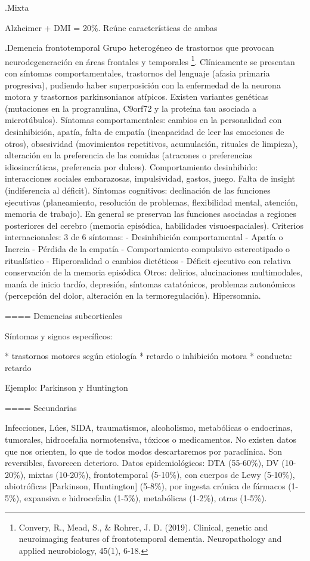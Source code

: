 .Mixta

Alzheimer + DMI = 20\%. Reúne características de ambas

.Demencia frontotemporal
Grupo heterogéneo de trastornos que provocan neurodegeneración en áreas frontales y temporales \footnote{Convery, R., Mead, S., \& Rohrer, J. D. (2019). Clinical, genetic and neuroimaging features of frontotemporal dementia. Neuropathology and applied neurobiology, 45(1), 6-18.}. Clínicamente se presentan con síntomas comportamentales, trastornos del lenguaje (afasia primaria progresiva), pudiendo haber superposición con la enfermedad de la neurona motora y trastornos parkinsonianos atípicos. Existen variantes genéticas (mutaciones en la progranulina, C9orf72 y la proteína tau asociada a microtúbulos).
Síntomas comportamentales: cambios en la personalidad con desinhibición, apatía, falta de empatía (incapacidad de leer las emociones de otros), obsesividad (movimientos repetitivos, acumulación, rituales de limpieza), alteración en la preferencia de las comidas (atracones o preferencias idiosincráticas, preferencia por dulces). Comportamiento desinhibido: interacciones sociales embarazosas, impulsividad, gastos, juego. Falta de insight (indiferencia al déficit).
Síntomas cognitivos: declinación de las funciones ejecutivas (planeamiento, resolución de problemas, flexibilidad mental, atención, memoria de trabajo). En general se preservan las funciones asociadas a regiones posteriores del cerebro (memoria episódica, habilidades visuoespaciales).
Criterios internacionales: 3 de 6 síntomas:
- Desinhibición comportamental
- Apatía o Inercia
- Pérdida de la empatía
- Comportamiento compulsivo estereotipado o ritualístico
- Hiperoralidad o cambios dietéticos
- Déficit ejecutivo con relativa conservación de la memoria episódica
Otros: delirios, alucinaciones multimodales, manía de inicio tardío, depresión, síntomas catatónicos, problemas autonómicos (percepción del dolor, alteración en la termoregulación). Hipersomnia.

==== Demencias subcorticales

Síntomas y signos específicos:

* trastornos motores según etiología
* retardo o inhibición motora
* conducta: retardo

Ejemplo: Parkinson y Huntington

==== Secundarias

Infecciones, Lúes, SIDA, traumatismos, alcoholismo, metabólicas o endocrinas, tumorales, hidrocefalia normotensiva, tóxicos o medicamentos. No existen datos que nos orienten, lo que de todos modos descartaremos por paraclínica. Son reversibles, favorecen deterioro. Datos epidemiológicos: DTA (55-60\%), DV (10-20\%), mixtas (10-20\%), frontotemporal (5-10\%), con cuerpos de Lewy (5-10\%), abiotróficas [Parkinson, Huntington] (5-8\%), por ingesta crónica de fármacos (1-5\%), expansiva e hidrocefalia (1-5\%), metabólicas (1-2\%), otras (1-5\%).

